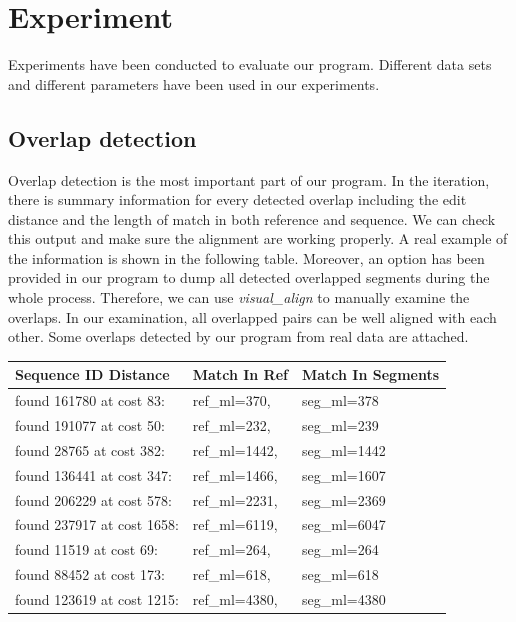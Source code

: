 \documentclass{article}
\begin{document}
\section{Experiment}

Experiments have been conducted to evaluate our program. Different data
sets and different parameters have been used in our experiments.

\subsection{Overlap detection}

Overlap detection is the most important part of our program. In the iteration,
        there is summary information for every detected overlap including the
        edit distance and the length of match in both reference and sequence. We
        can check this output and make sure the alignment are working properly.
        A real example of the information is shown in the following table.
        Moreover, an option has been provided in our program to dump all
        detected overlapped segments during the whole process. Therefore, we can
        use \emph{visual\_align} to manually examine the overlaps. In our
        examination, all overlapped pairs can be well aligned with each other.
        Some overlaps detected by our program from real data are attached.

\begin{center}
\begin{tabular}{lll}
Sequence ID Distance & Match In Ref & Match In Segments\\
\hline
found 161780 at cost 83: & ref\_ml=370, & seg\_ml=378\\
found 191077 at cost 50: & ref\_ml=232, & seg\_ml=239\\
found 28765 at cost 382: & ref\_ml=1442, & seg\_ml=1442\\
found 136441 at cost 347: & ref\_ml=1466, & seg\_ml=1607\\
found 206229 at cost 578: & ref\_ml=2231, & seg\_ml=2369\\
found 237917 at cost 1658: & ref\_ml=6119, & seg\_ml=6047\\
found 11519 at cost 69: & ref\_ml=264, & seg\_ml=264\\
found 88452 at cost 173: & ref\_ml=618, & seg\_ml=618\\
found 123619 at cost 1215: & ref\_ml=4380, & seg\_ml=4380\\
\end{tabular}
\end{center}
\end{document}
